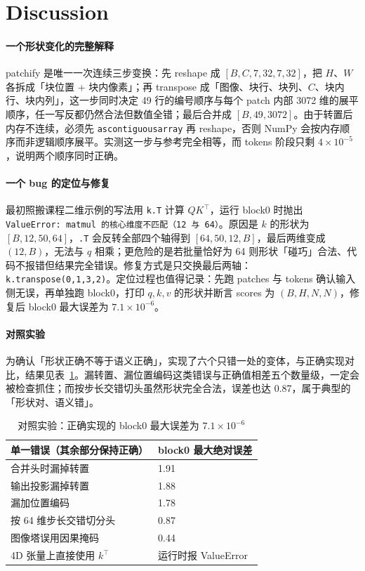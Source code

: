 \documentclass[a4paper,12pt]{article}
\begin{document}
\section{Discussion}

\paragraph{一个形状变化的完整解释}
patchify 是唯一一次连续三步变换：先 reshape 成 $[B,C,7,32,7,32]$，把 $H$、$W$ 各拆成「块位置 + 块内像素」；再 transpose 成「图像、块行、块列、$C$、块内行、块内列」，这一步同时决定 49 行的编号顺序与每个 patch 内部 3072 维的展平顺序，任一写反都仍然合法但数值全错；最后合并成 $[B,49,3072]$。由于转置后内存不连续，必须先 \texttt{ascontiguousarray} 再 reshape，否则 NumPy 会按内存顺序而非逻辑顺序展平。实测这一步与参考完全相等，而 tokens 阶段只剩 $4\times10^{-5}$，说明两个顺序同时正确。

\paragraph{一个 bug 的定位与修复}
最初照搬课程二维示例的写法用 \texttt{k.T} 计算 $QK^{\top}$，运行 block0 时抛出 \texttt{ValueError: matmul 的核心维度不匹配（12 与 64）}。原因是 $k$ 的形状为 $[B,12,50,64]$，\texttt{.T} 会反转全部四个轴得到 $[64,50,12,B]$，最后两维变成 $(12,B)$，无法与 $q$ 相乘；更危险的是若批量恰好为 64 则形状「碰巧」合法、代码不报错但结果完全错误。修复方式是只交换最后两轴：\texttt{k.transpose(0,1,3,2)}。定位过程也值得记录：先跑 patches 与 tokens 确认输入侧无误，再单独跑 block0，打印 $q,k,v$ 的形状并断言 scores 为 $(B,H,N,N)$，修复后 block0 最大误差为 $7.1\times10^{-6}$。

\paragraph{对照实验}
为确认「形状正确不等于语义正确」，实现了六个只错一处的变体，与正确实现对比，结果见表~\ref{tab:ablation}。漏转置、漏位置编码这类错误与正确值相差五个数量级，一定会被检查抓住；而按步长交错切头虽然形状完全合法，误差也达 0.87，属于典型的「形状对、语义错」。

\begin{table}[H]
    \centering
    \small
    \begin{tabular}{|p{9.4cm}|p{3.2cm}|}
    \hline
    单一错误（其余部分保持正确） & block0 最大绝对误差 \\
    \hline
    合并头时漏掉转置 & 1.91 \\
    \hline
    输出投影漏掉转置 & 1.88 \\
    \hline
    漏加位置编码 & 1.78 \\
    \hline
    按 64 维步长交错切分头 & 0.87 \\
    \hline
    图像塔误用因果掩码 & 0.44 \\
    \hline
    4D 张量上直接使用 $k^{\top}$ & 运行时报 ValueError \\
    \hline
    \end{tabular}
    \caption{对照实验：正确实现的 block0 最大误差为 $7.1\times10^{-6}$}
    \label{tab:ablation}
\end{table}
\end{document}
